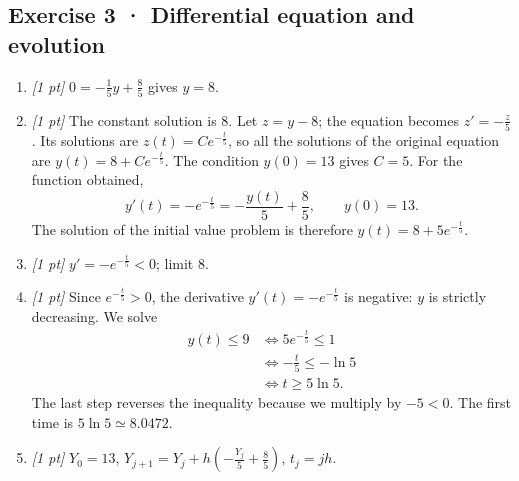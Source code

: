 \subsection*{Exercise 3 · Differential equation and evolution}\begin{enumerate}

\item \textit{[1 pt]} $0=-\frac{1}{5}y+\frac{8}{5}$ gives $y=8$.

\item \textit{[1 pt]} The constant solution is $8$. Let $z=y-8$; the equation becomes $z'=-\frac{z}{5}$. Its solutions are $z(t)=Ce^{-\frac{t}{5}}$, so all the solutions of the original equation are $y(t)=8+Ce^{-\frac{t}{5}}$.
The condition $y(0)=13$ gives $C=5$. For the function obtained,
\[y'(t)=-e^{-\frac{t}{5}}=-\frac{y(t)}{5}+\frac{8}{5},\qquad y(0)=13.\]
The solution of the initial value problem is therefore $y(t)=8+5e^{-\frac{t}{5}}$.

\item \textit{[1 pt]} $y'=-e^{-\frac{t}{5}}<0$; limit $8$.

\item \textit{[1 pt]} Since $e^{-\frac{t}{5}}>0$, the derivative $y'(t)=-e^{-\frac{t}{5}}$ is negative: $y$ is strictly decreasing. We solve
\[\begin{aligned}y(t)\le 9&\Longleftrightarrow 5e^{-\frac{t}{5}}\le1\\&\Longleftrightarrow -\frac{t}{5}\le-\ln 5\\&\Longleftrightarrow t\ge 5\ln 5.\end{aligned}\]
The last step reverses the inequality because we multiply by $-5<0$. The first time is $5\ln 5\simeq8.0472$.

\item \textit{[1 pt]} $Y_0=13$, $Y_{j+1}=Y_j+h(-\frac{Y_j}{5}+\frac{8}{5})$, $t_j=jh$.

\end{enumerate}

